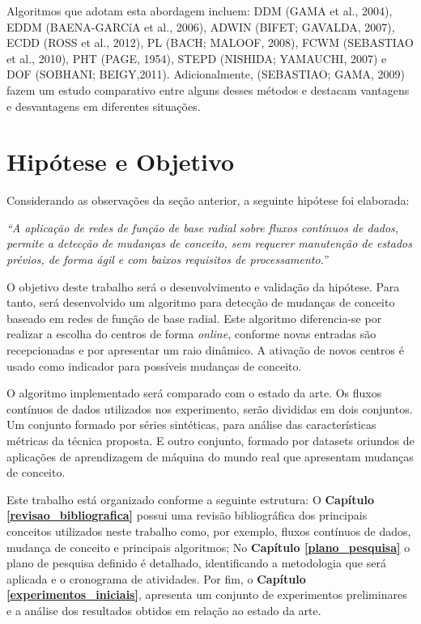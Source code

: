 \documentclass[qual, classic, a4paper]{ufbathesis}
\begin{document}
Algoritmos que adotam esta abordagem incluem: 
DDM (GAMA et al., 2004), EDDM (BAENA-GARCíA et al., 2006), 
ADWIN (BIFET; GAVALDA, 2007), ECDD (ROSS et al., 2012), 
PL (BACH; MALOOF, 2008), FCWM (SEBASTIAO et al., 2010),
PHT (PAGE, 1954), STEPD (NISHIDA; YAMAUCHI, 2007) e DOF (SOBHANI; BEIGY,2011). 
Adicionalmente, (SEBASTIAO; GAMA, 2009) fazem um estudo comparativo entre alguns desses métodos e destacam vantagens e desvantagens em diferentes situações.

\section{Hipótese e Objetivo}

Considerando as observações da seção anterior, a seguinte hipótese foi elaborada:

\begin{center}
\textit{``A aplicação de redes de função de base radial sobre fluxos contínuos de dados, permite a detecção de mudanças de conceito, sem requerer manutenção de estados prévios, de forma ágil e com baixos requisitos de processamento.''}
\end{center}

O objetivo deste trabalho será o desenvolvimento e validação da hipótese.
Para tanto, será desenvolvido um algoritmo para detecção de mudanças de conceito baseado em redes de função de base radial. Este algoritmo diferencia-se por realizar a escolha do centros de forma \textit{online}, conforme novas entradas são recepcionadas e por apresentar um raio dinâmico. 
A ativação de novos centros é usado como indicador para possíveis mudanças de conceito.

O algoritmo implementado será comparado com o estado da arte. Os fluxos contínuos de dados utilizados nos experimento, serão divididas em dois conjuntos. Um conjunto formado por séries sintéticas, para análise das características métricas da técnica proposta. E outro conjunto, formado por datasets oriundos de aplicações de aprendizagem de máquina do mundo real que apresentam mudanças de conceito.

Este trabalho está organizado conforme a seguinte estrutura: O \textbf{Capítulo \ref{revisao_bibliografica}} possui uma revisão bibliográfica dos principais conceitos utilizados neste trabalho como, por exemplo, fluxos contínuos de dados, mudança de conceito e principais algoritmos; No \textbf{Capítulo \ref{plano_pesquisa}} o plano de pesquisa definido é detalhado, identificando a metodologia que será aplicada e o cronograma de atividades. Por fim, o \textbf{Capítulo \ref{experimentos_iniciais}}, apresenta um conjunto de experimentos preliminares e a análise dos resultados obtidos em relação ao estado da arte.
\end{document}
